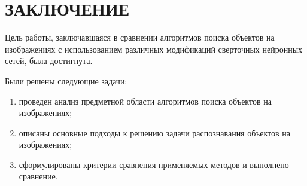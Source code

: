 \chapter*{ЗАКЛЮЧЕНИЕ}

Цель работы, заключавшаяся в сравнении алгоритмов поиска объектов на изображениях с использованием различных модификаций сверточных нейронных сетей, была достигнута.

Были решены следующие задачи:
\begin{enumerate}
	\item проведен анализ предметной области алгоритмов поиска объектов на изображениях;
	\item описаны основные подходы к решению задачи распознавания объектов на изображениях;
	\item сформулированы критерии сравнения применяемых методов и выполнено сравнение.
\end{enumerate}